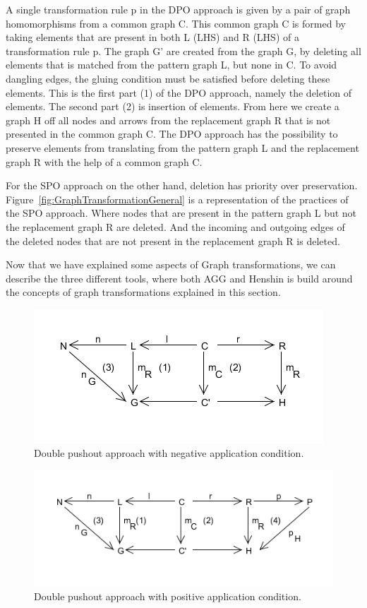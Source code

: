 A single transformation rule p in the DPO approach is given by a pair of graph
homomorphisms from a common graph C. This common graph C is formed by taking
elements that are present in both L (LHS) and R (LHS) of a transformation rule
p. The graph G' are created from the graph G, by deleting all elements that is
matched from the pattern graph L, but none in C. To avoid dangling edges,
the gluing condition must be satisfied before deleting these elements. This is
the first part (1) of the DPO approach, namely the deletion of elements. The
second part (2) is insertion of elements. From here we create a graph H off all
nodes and arrows from the replacement graph R that is not presented in the
common graph C. The DPO approach has the possibility to preserve elements from
translating from the pattern graph L and the replacement graph R with the help
of a common graph C.

For the SPO approach on the other hand, deletion has priority over preservation.
Figure~\ref{fig:GraphTransformationGeneral} is a representation of the practices
of the SPO approach. Where nodes that are present in the pattern graph L but not
the replacement graph R are deleted. And the incoming and outgoing edges of the
deleted nodes that are not present in the replacement graph R is deleted.

Now that we have explained some aspects of Graph transformations, we can
describe the three different tools, where both AGG and Henshin is build around
the concepts of graph transformations explained in this section. 

\begin{figure}[H]
	\centering
	\includegraphics[scale=0.7]{./Figures/Double_Pushout_NAC.png}
	\caption[The Double Pushout approach with NAC]
	{Double pushout approach with negative application condition.}
	\label{fig:DPO_NAC}
\end{figure}

\begin{figure}[H]
	\centering
	\includegraphics[scale=0.7]{./Figures/Double_Pushout_PAC.png}
	\caption[The Double Pushout approach with PAC]
	{Double pushout approach with positive application condition.}
	\label{fig:DPO_NAC}
\end{figure}

